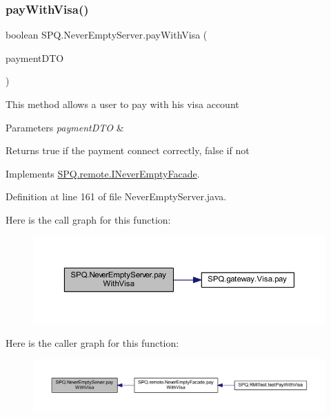 \subsubsection{\texorpdfstring{pay\+With\+Visa()}{payWithVisa()}}
{\footnotesize\ttfamily boolean S\+P\+Q.\+Never\+Empty\+Server.\+pay\+With\+Visa (\begin{DoxyParamCaption}\item[{\mbox{\hyperlink{class_s_p_q_1_1dto_1_1_payment_d_t_o}{Payment\+D\+TO}}}]{payment\+D\+TO }\end{DoxyParamCaption})}

This method allows a user to pay with his visa account 
\begin{DoxyParams}{Parameters}
{\em payment\+D\+TO} & \\
\hline
\end{DoxyParams}
\begin{DoxyReturn}{Returns}
true if the payment connect correctly, false if not 
\end{DoxyReturn}


Implements \mbox{\hyperlink{interface_s_p_q_1_1remote_1_1_i_never_empty_facade_a3b7058d95e7b73bdcc09220ecfc2d744}{S\+P\+Q.\+remote.\+I\+Never\+Empty\+Facade}}.



Definition at line 161 of file Never\+Empty\+Server.\+java.

Here is the call graph for this function\+:\nopagebreak
\begin{figure}[H]
\begin{center}
\leavevmode
\includegraphics[width=350pt]{class_s_p_q_1_1_never_empty_server_a455fa773e66917007842f9a92243ffa8_cgraph}
\end{center}
\end{figure}
Here is the caller graph for this function\+:\nopagebreak
\begin{figure}[H]
\begin{center}
\leavevmode
\includegraphics[width=350pt]{class_s_p_q_1_1_never_empty_server_a455fa773e66917007842f9a92243ffa8_icgraph}
\end{center}
\end{figure}
\mbox{\label{class_s_p_q_1_1_never_empty_server_abf7e271e0edb91e8f8ed73063de74b03}} 
